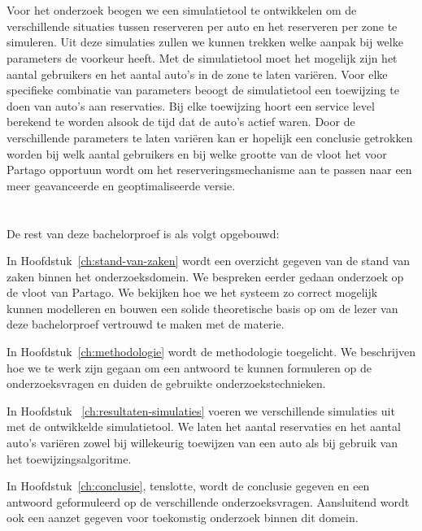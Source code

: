 \section{}
\label{sec:onderzoeksdoelstelling}

Voor het onderzoek beogen we een simulatietool te ontwikkelen om de verschillende situaties tussen reserveren per auto en het reserveren per zone te simuleren. Uit deze simulaties zullen we kunnen trekken welke aanpak bij welke parameters de voorkeur heeft. Met de simulatietool moet het mogelijk zijn het aantal gebruikers en het aantal auto's in de zone te laten variëren. Voor elke specifieke combinatie van parameters beoogt de simulatietool een toewijzing te doen van auto's aan reservaties. Bij elke toewijzing hoort een service level berekend te worden alsook de tijd dat de auto's actief waren. Door de verschillende parameters te laten variëren kan er hopelijk een conclusie getrokken worden bij welk aantal gebruikers en bij welke grootte van de vloot het voor Partago opportuun wordt om het reserveringsmechanisme aan te passen naar een meer geavanceerde en geoptimaliseerde versie.

\section{}
\label{sec:opzet-bachelorproef}


De rest van deze bachelorproef is als volgt opgebouwd:

In Hoofdstuk~\ref{ch:stand-van-zaken} wordt een overzicht gegeven van de stand van zaken binnen het onderzoeksdomein. We bespreken eerder gedaan onderzoek op de vloot van Partago. We bekijken hoe we het systeem zo correct mogelijk kunnen modelleren en bouwen een solide theoretische basis op om de lezer van deze bachelorproef vertrouwd te maken met de materie.

In Hoofdstuk~\ref{ch:methodologie} wordt de methodologie toegelicht. We beschrijven hoe we te werk zijn gegaan om een antwoord te kunnen formuleren op de onderzoeksvragen en duiden de gebruikte onderzoekstechnieken.

In Hoofdstuk ~\ref{ch:resultaten-simulaties} voeren we verschillende simulaties uit met de ontwikkelde simulatietool. We laten het aantal reservaties en het aantal auto's variëren zowel bij willekeurig toewijzen van een auto als bij gebruik van het toewijzingsalgoritme.

In Hoofdstuk~\ref{ch:conclusie}, tenslotte, wordt de conclusie gegeven en een antwoord geformuleerd op de verschillende onderzoeksvragen. Aansluitend wordt ook een aanzet gegeven voor toekomstig onderzoek binnen dit domein.